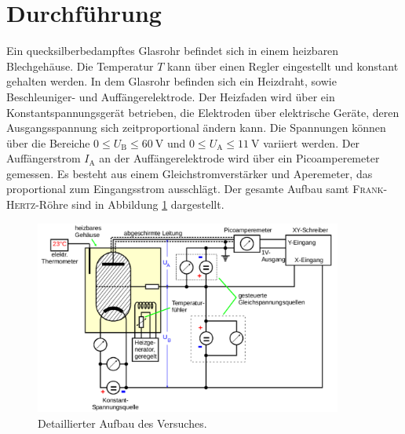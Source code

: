 \section{Durchführung}
\label{sec:Durchfuehrung}
Ein quecksilberbedampftes Glasrohr befindet sich in einem heizbaren Blechgehäuse. Die Temperatur $T$ kann über einen Regler eingestellt und konstant gehalten werden. In dem Glasrohr befinden sich ein Heizdraht, sowie Beschleuniger- und Auffängerelektrode.
Der Heizfaden wird über ein Konstantspannungsgerät betrieben, die Elektroden über elektrische Geräte, deren Ausgangsspannung sich zeitproportional ändern kann. 
Die Spannungen können über die Bereiche $0\leq U_\mathup{B} \leq \SI{60}{\volt}$ und $0\leq U_\mathup{A}\leq \SI{11}{\volt}$ variiert werden. Der Auffängerstrom $I_\mathup{A}$ an der Auffängerelektrode wird über ein Picoamperemeter gemessen.
Es besteht aus einem Gleichstromverstärker und Aperemeter, das proportional zum Eingangsstrom ausschlägt. 
Der gesamte Aufbau samt \textsc{Frank}-\textsc{Hertz}-Röhre sind in Abbildung \ref{fig:aufbau} dargestellt.
\begin{figure}
	\centering
	\includegraphics[width=0.9\textwidth]{Bilder/Aufbau_Detail.pdf}
	\caption{Detaillierter Aufbau des Versuches.\cite{skript}}
	\label{fig:aufbau}
\end{figure}
